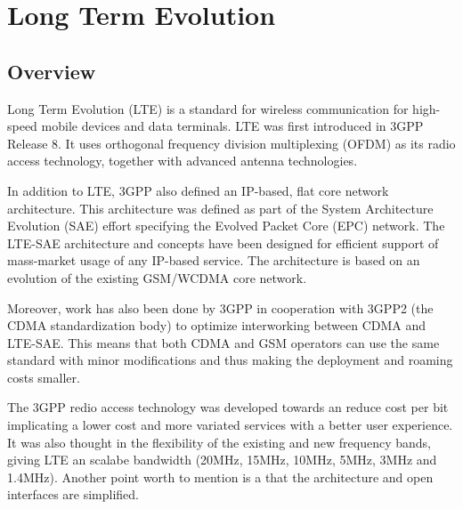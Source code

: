 
\section{Long Term Evolution} %
\label{let:lte}

\subsection{Overview}

Long Term Evolution (LTE) is a standard for wireless communication for
high-speed mobile devices and data terminals. LTE was first introduced in 3GPP
Release 8. It uses orthogonal frequency division multiplexing (OFDM) as its
radio access technology, together with advanced antenna technologies.

In addition to LTE, 3GPP also defined an IP-based, flat core network
architecture. This architecture was defined as part of the System Architecture
Evolution (SAE) effort specifying the Evolved Packet Core (EPC) network. The
LTE-SAE architecture and concepts have been designed for efficient support of
mass-market usage of any IP-based service. The architecture is based on an
evolution of the existing GSM/WCDMA core network.%

Moreover, work has also been done by 3GPP in cooperation with 3GPP2 (the CDMA
standardization body) to optimize interworking between CDMA and LTE-SAE. This means
that both CDMA and GSM operators can use the same standard with minor modifications
and thus making the deployment and roaming costs smaller.

The 3GPP redio access technology was developed towards an reduce cost per bit
implicating a lower cost and more variated services with a better user
experience. It was also thought in the flexibility of the existing and new
frequency  bands, giving LTE an scalabe bandwidth (20MHz, 15MHz, 10MHz, 5MHz,
3MHz and 1.4MHz). Another point worth to mention is a that the architecture and
open interfaces are simplified.


%

